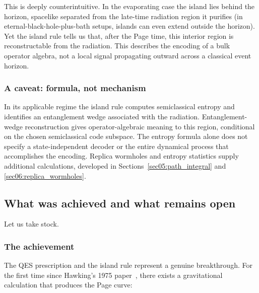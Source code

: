 \documentclass[11pt,letterpaper]{article}
\theoremstyle{plain}
\theoremstyle{definition}
\theoremstyle{remark}
\begin{document}
This is deeply counterintuitive.  In the evaporating case the island
lies behind the horizon, spacelike separated from the late-time
radiation region it purifies (in eternal-black-hole-plus-bath setups,
islands can even extend outside the horizon).  Yet the island rule
tells us that, after the Page time, this interior region is
reconstructable from the radiation.  This describes the encoding of a bulk operator algebra, not a local
signal propagating outward across a classical event horizon.

\subsubsection*{A caveat: formula, not mechanism}

In its applicable regime the island rule computes semiclassical entropy
and identifies an entanglement wedge associated with the radiation.
Entanglement-wedge reconstruction gives operator-algebraic meaning to this
region, conditional on the chosen semiclassical code subspace. The entropy
formula alone does not specify a state-independent decoder or the entire
dynamical process that accomplishes the encoding. Replica wormholes and
entropy statistics supply additional calculations, developed in
Sections~\ref{sec05:path_integral} and \ref{sec06:replica_wormholes}.

\subsection{What was achieved and what remains open}
\label{subsec04:achieved}

Let us take stock.

\subsubsection*{The achievement}

The QES prescription and the island rule represent a genuine
breakthrough.  For the first time since Hawking's 1975
paper~\citep{hawking1975}, there exists a gravitational calculation
that produces the Page curve:
\end{document}
